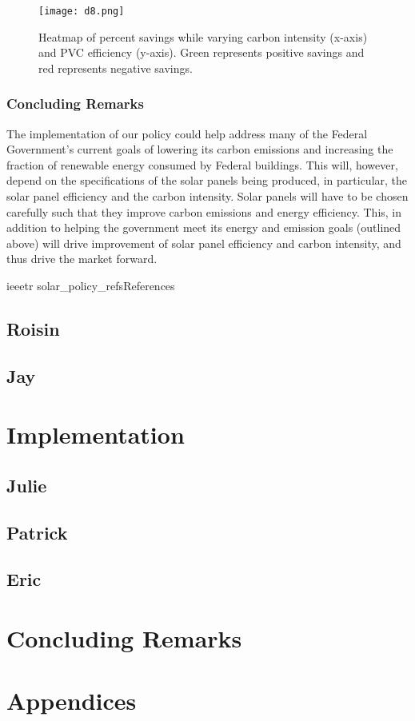 \documentclass[10pt]{book} %
\begin{document}
\begin{figure}
\begin{center}
\texttt{[image: d8.png]}
\caption{Heatmap of percent savings while varying carbon intensity (x-axis) and PVC efficiency (y-axis). Green represents positive savings and red represents negative savings.}
\label{d8}
\end{center}
\end{figure}


\subsection{Concluding Remarks}
The implementation of our policy could help address many of the Federal Government’s current goals of lowering its carbon emissions and increasing the fraction of renewable energy consumed by Federal buildings. This will, however, depend on the specifications of the solar panels being produced, in particular, the solar panel efficiency and the carbon intensity. Solar panels will have to be chosen carefully such that they improve carbon emissions and energy efficiency. This, in addition to helping the government meet its energy and emission goals (outlined above) will drive improvement of solar panel efficiency and carbon intensity, and thus drive the market forward.

\clearpage
{ieeetr}
{solar_policy_refs}{References}


\section{Roisin}

\section{Jay}

\chapter{Implementation}


\section{Julie}

\section{Patrick}

\section{Eric}



\chapter{Concluding Remarks}

\chapter*{Appendices}


\clearpage



\end{document}
